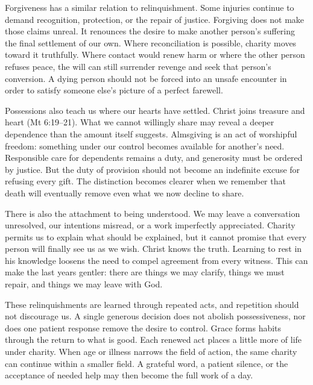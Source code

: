 Forgiveness has a similar relation to relinquishment. Some injuries continue to demand recognition, protection, or the repair of justice. Forgiving does not make those claims unreal. It renounces the desire to make another person's suffering the final settlement of our own. Where reconciliation is possible, charity moves toward it truthfully. Where contact would renew harm or where the other person refuses peace, the will can still surrender revenge and seek that person's conversion. A dying person should not be forced into an unsafe encounter in order to satisfy someone else's picture of a perfect farewell.

Possessions also teach us where our hearts have settled. Christ joins treasure and heart (Mt 6:19--21). What we cannot willingly share may reveal a deeper dependence than the amount itself suggests. Almsgiving is an act of worshipful freedom: something under our control becomes available for another's need. Responsible care for dependents remains a duty, and generosity must be ordered by justice. But the duty of provision should not become an indefinite excuse for refusing every gift. The distinction becomes clearer when we remember that death will eventually remove even what we now decline to share.

There is also the attachment to being understood. We may leave a conversation unresolved, our intentions misread, or a work imperfectly appreciated. Charity permits us to explain what should be explained, but it cannot promise that every person will finally see us as we wish. Christ knows the truth. Learning to rest in his knowledge loosens the need to compel agreement from every witness. This can make the last years gentler: there are things we may clarify, things we must repair, and things we may leave with God.

These relinquishments are learned through repeated acts, and repetition should not discourage us. A single generous decision does not abolish possessiveness, nor does one patient response remove the desire to control. Grace forms habits through the return to what is good. Each renewed act places a little more of life under charity. When age or illness narrows the field of action, the same charity can continue within a smaller field. A grateful word, a patient silence, or the acceptance of needed help may then become the full work of a day.

